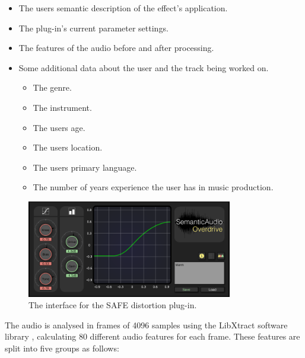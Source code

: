 		\begin{itemize}
			\item The users semantic description of the effect's application.
			\item The plug-in's current parameter settings.
			\item The features of the audio before and after processing.
			\item Some additional data about the user and the track being worked on.
			\begin{itemize}
				\item The genre.
				\item The instrument.
				\item The users age.
				\item The users location.
				\item The users primary language.
				\item The number of years experience the user has in music production.
			\end{itemize}
		\end{itemize}

		\begin{figure}[h!]
			\centering
			\includegraphics[width=0.8\textwidth]{chapter4/Images/SAFEDistortion.png}
			\caption{The interface for the SAFE distortion plug-in.}
			\label{fig:SAFE-Distortion}
		\end{figure}

		The audio is analysed in frames of 4096 samples using the LibXtract software library
		\citep{bullock2007libxtract}, calculating 80 different audio features for each frame. These features are
		split into five groups as follows:

